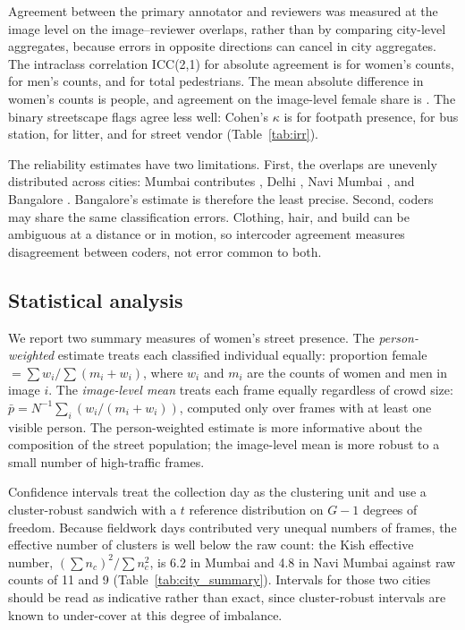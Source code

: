 \documentclass[12pt]{article}
\begin{document}
Agreement between the primary annotator and reviewers was measured at the image level on the \IRROverlaps{} image--reviewer overlaps, rather than by comparing city-level aggregates, because errors in opposite directions can cancel in city aggregates. The intraclass correlation ICC(2,1) for absolute agreement is \IRRWomenCountICC{} for women's counts, \IRRMenCountICC{} for men's counts, and \IRRTotalCountICC{} for total pedestrians. The mean absolute difference in women's counts is \IRRWomenCountMAD{} people, and agreement on the image-level female share is \IRRWomenShareICC{}. The binary streetscape flags agree less well: Cohen's $\kappa$ is \IRRFootpathKappa{} for footpath presence, \IRRBusStationKappa{} for bus station, \IRRLitterKappa{} for litter, and \IRRStreetVendorKappa{} for street vendor (Table~\ref{tab:irr}).

The reliability estimates have two limitations. First, the overlaps are unevenly distributed across cities: Mumbai contributes \IRRMumbaiOverlaps{}, Delhi \IRRDelhiOverlaps{}, Navi Mumbai \IRRNaviMumbaiOverlaps{}, and Bangalore \IRRBangaloreOverlaps{}. Bangalore's estimate is therefore the least precise. Second, coders may share the same classification errors. Clothing, hair, and build can be ambiguous at a distance or in motion, so intercoder agreement measures disagreement between coders, not error common to both.


\subsection{Statistical analysis}

We report two summary measures of women's street presence. The \textit{person-weighted} estimate treats each classified individual equally: proportion female $= \sum w_i / \sum (m_i + w_i)$, where $w_i$ and $m_i$ are the counts of women and men in image $i$. The \textit{image-level mean} treats each frame equally regardless of crowd size: $\bar{p} = N^{-1} \sum_i (w_i / (m_i + w_i))$, computed only over frames with at least one visible person. The person-weighted estimate is more informative about the composition of the street population; the image-level mean is more robust to a small number of high-traffic frames.

Confidence intervals treat the collection day as the clustering unit and use a cluster-robust sandwich with a $t$ reference distribution on $G-1$ degrees of freedom. Because fieldwork days contributed very unequal numbers of frames, the effective number of clusters is well below the raw count: the Kish effective number, $(\sum n_c)^2 / \sum n_c^2$, is 6.2 in Mumbai and 4.8 in Navi Mumbai against raw counts of 11 and 9 (Table~\ref{tab:city_summary}). Intervals for those two cities should be read as indicative rather than exact, since cluster-robust intervals are known to under-cover at this degree of imbalance.
\end{document}
